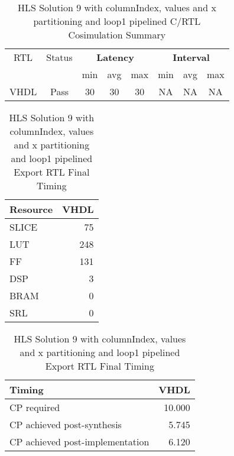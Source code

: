 \begin{table}[H]
	\centering
	\begin{tabular}{|c|c|c|c|c|c|c|c|}
		\hline
		\multicolumn{1}{|c|}{RTL} & \multicolumn{1}{|c|}{Status} & \multicolumn{3}{c|}{\textbf{Latency}} & \multicolumn{3}{c|}{\textbf{Interval}} \\
		&  & min & avg & max & min & avg & max \\
		\hline
		VHDL & Pass & 30 & 30 & 30 & NA & NA & NA \\
		\hline
	\end{tabular}
	\caption{HLS Solution 9 with columnIndex, values and x partitioning and loop1 pipelined C/RTL Cosimulation Summary }
	\label{tab:hls-solution-9-loop1-pipeline-cosimulation-summary}
\end{table}

\begin{table}[H]
	\centering
	\begin{minipage}[t]{0.45\linewidth}
		\centering
		\begin{tabular}{|l|r|}
			\hline
			\textbf{Resource} & \textbf{VHDL} \\
			\hline
			SLICE & 75 \\
			\hline
			LUT & 248 \\
			\hline
			FF & 131 \\
			\hline
			DSP & 3 \\
			\hline
			BRAM & 0 \\
			\hline
			SRL & 0 \\
			\hline
		\end{tabular}
		\caption{HLS Solution 9 with columnIndex, values and x partitioning and loop1 pipelined Export RTL Resource Usage}
		\label{tab:hls-solution-9-loop1-pipeline-export-rtl-resoruce-usage}
	\end{minipage}
	\hfill
	\begin{minipage}[t]{0.45\linewidth}
		\centering
		\begin{tabular}{|l|r|}
			\hline
			\textbf{Timing} & \textbf{VHDL} \\
			\hline
			CP required & 10.000 \\
			\hline
			CP achieved post-synthesis & 5.745 \\
			\hline
			CP achieved post-implementation & 6.120 \\
			\hline
		\end{tabular}
		\caption{HLS Solution 9 with columnIndex, values and x partitioning and loop1 pipelined Export RTL Final Timing}
		\label{tab:hls-solution-9-loop1-pipeline-export-rtl-final-timing}
	\end{minipage}
\end{table}


